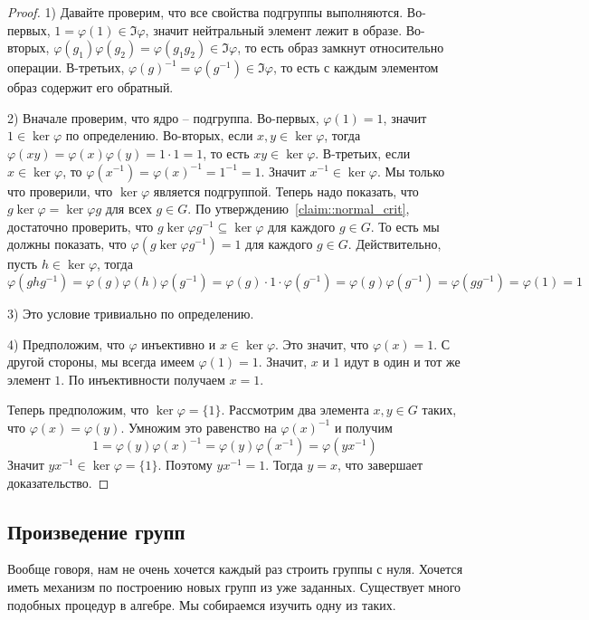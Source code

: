 \begin{proof}
1) Давайте проверим, что все свойства подгруппы выполняются.
Во-первых, $1 = \varphi(1) \in \Im \varphi$, значит нейтральный элемент лежит в образе.
Во-вторых, $\varphi(g_1)\varphi(g_2) = \varphi(g_1 g_2) \in \Im\varphi$, то есть образ замкнут относительно операции.
В-третьих, $\varphi(g)^{-1} = \varphi(g^{-1}) \in \Im\varphi$, то есть с каждым элементом образ содержит его обратный.

2) Вначале проверим, что ядро -- подгруппа.
Во-первых, $\varphi(1) = 1$, значит $1 \in \ker \varphi$ по определению.
Во-вторых, если $x, y\in \ker \varphi$, тогда $\varphi(xy) = \varphi(x) \varphi(y) = 1\cdot 1 = 1$, то есть $xy\in \ker\varphi$.
В-третьих, если $x\in \ker\varphi$, то $\varphi(x^{-1}) = \varphi(x)^{-1} = 1^{-1} = 1$.
Значит $x^{-1}\in \ker\varphi$.
Мы только что проверили, что $\ker \varphi$ является подгруппой.
Теперь надо показать, что $g \ker \varphi = \ker \varphi g$ для всех $g\in G$.
По утверждению~\ref{claim::normal_crit}, достаточно проверить, что $g\ker \varphi g^{-1}\subseteq \ker \varphi$ для каждого $g\in G$.
То есть мы должны показать, что $\varphi(g \ker \varphi g^{-1}) = 1$ для каждого $g\in G$.
Действительно, пусть $h\in \ker \varphi$, тогда
\[
\varphi(g h g^{-1}) = \varphi(g) \varphi(h) \varphi(g^{-1}) = \varphi(g) \cdot 1 \cdot \varphi(g^{-1}) = \varphi(g) \varphi(g^{-1}) = \varphi(g g^{-1}) = \varphi(1) = 1
\]

3) Это условие тривиально по определению.

4) Предположим, что $\varphi$ инъективно и $x\in \ker\varphi$.
Это значит, что $\varphi(x) = 1$.
С другой стороны, мы всегда имеем $\varphi(1) = 1$.
Значит, $x$ и $1$ идут в один и тот же элемент $1$.
По инъективности получаем $x = 1$.

Теперь предположим, что $\ker \varphi = \{1\}$.
Рассмотрим два элемента $x, y\in G$ таких, что $\varphi(x) = \varphi(y)$.
Умножим это равенство на $\varphi(x)^{-1}$ и получим
\[
1 = \varphi(y) \varphi(x)^{-1} = \varphi(y) \varphi(x^{-1}) = \varphi(yx^{-1})
\]
Значит $yx^{-1}\in\ker\varphi = \{1\}$.
Поэтому $y x^{-1} = 1$.
Тогда $y = x$, что завершает доказательство.
\end{proof}

\subsection{Произведение групп}

Вообще говоря, нам не очень хочется каждый раз строить группы с нуля.
Хочется иметь механизм по построению новых групп из уже заданных.
Существует много подобных процедур в алгебре.
Мы собираемся изучить одну из таких.

